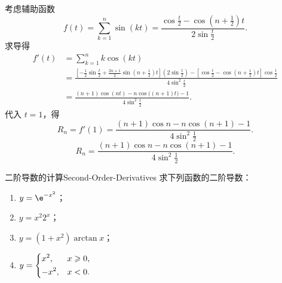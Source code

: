 \begin{solution}

    考虑辅助函数
    \begin{equation}
        f(t) = \sum_{k=1}^n \sin(kt) = \frac{\cos\frac{t}{2} - \cos\left(n + \frac{1}{2}\right)t}{2\sin\frac{t}{2}}.
    \end{equation}
    求导得
    \begin{equation}
        \begin{aligned}
            f'(t) & = \sum_{k=1}^n k\cos(kt)                                                                                                                                                                                                               \\
                  & = \frac{\left[ -\frac{1}{2}\sin\frac{t}{2} + \frac{2n+1}{2}\sin\left(n+\frac{1}{2}\right)t \right]\left(2\sin\frac{t}{2}\right) - \left[ \cos\frac{t}{2} - \cos\left(n+\frac{1}{2}\right)t \right]\cos\frac{t}{2}}{4\sin^2\frac{t}{2}} \\
                  & = \frac{(n+1)\cos(nt) - n\cos\bigl((n+1)t\bigr) - 1}{4\sin^2\frac{t}{2}}.
        \end{aligned}
    \end{equation}
    代入 $t = 1$，得
    \begin{equation}
        R_n = f'(1) = \frac{(n+1)\cos n - n\cos(n+1) - 1}{4\sin^2\frac{1}{2}}.
    \end{equation}
    \begin{equation}
        \boxed{R_n = \frac{(n+1)\cos n - n\cos(n+1) - 1}{4\sin^2\frac{1}{2}}.}
    \end{equation}
\end{solution}

\begin{problem}{二阶导数的计算}{Second-Order-Derivatives}
    求下列函数的二阶导数：
    \begin{enumerate}
        \item $y = \e^{-x^2}$；
        \item $y = x^2 2^x$；
        \item $y = (1 + x^2)\arctan x$；
        \item $y = \begin{dcases} x^2, & x \geqslant 0, \\ -x^2, & x < 0. \end{dcases}$
    \end{enumerate}
\end{problem}


